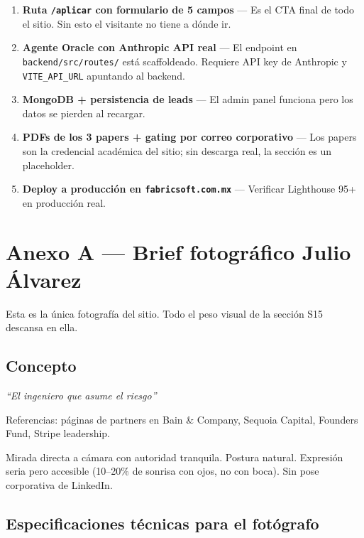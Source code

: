 \documentclass[11pt, a4paper]{article}
\newcommand{\ruta}[1]{\texttt{\color{accent2}#1}}
\begin{document}
\begin{enumerate}[leftmargin=*, label=\textbf{\arabic*.}]
  \item \textbf{Ruta \ruta{/aplicar} con formulario de 5 campos} —
        Es el CTA final de todo el sitio. Sin esto el visitante no tiene a dónde ir.
  \item \textbf{Agente Oracle con Anthropic API real} —
        El endpoint en \ruta{backend/src/routes/} está scaffoldeado.
        Requiere API key de Anthropic y \texttt{VITE\_API\_URL} apuntando al backend.
  \item \textbf{MongoDB + persistencia de leads} —
        El admin panel funciona pero los datos se pierden al recargar.
  \item \textbf{PDFs de los 3 papers + gating por correo corporativo} —
        Los papers son la credencial académica del sitio; sin descarga real,
        la sección es un placeholder.
  \item \textbf{Deploy a producción en \texttt{fabricsoft.com.mx}} —
        Verificar Lighthouse 95+ en producción real.
\end{enumerate}

\newpage


\section*{Anexo A — Brief fotográfico Julio Álvarez}

Esta es la única fotografía del sitio. Todo el peso visual de la sección S15
descansa en ella.

\subsection*{Concepto}

\textit{``El ingeniero que asume el riesgo''}

Referencias: páginas de partners en Bain \& Company, Sequoia Capital,
Founders Fund, Stripe leadership.

Mirada directa a cámara con autoridad tranquila. Postura natural.
Expresión seria pero accesible (10--20\% de sonrisa con ojos, no con boca).
Sin pose corporativa de LinkedIn.

\subsection*{Especificaciones técnicas para el fotógrafo}
\end{document}

